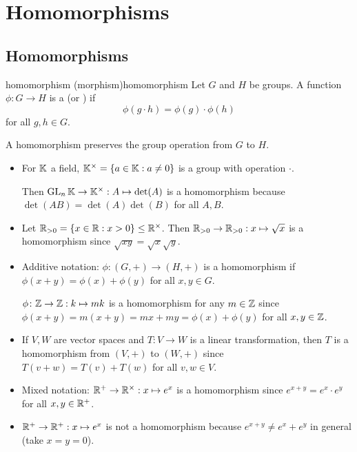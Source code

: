\documentclass[12pt,letterpaper]{report}
\begin{document}
\section{Homomorphisms}

\subsection{Homomorphisms}

\begin{defn}{homomorphism (morphism)}{homomorphism}
  Let $G$ and $H$ be groups.
  A function $\phi \colon G \to H$ is a  (or ) if
  \[ \phi(g \cdot h) = \phi(g) \cdot \phi(h) \]
  for all $g, h \in G$.
\end{defn}

A homomorphism preserves the group operation from $G$ to $H$.

\begin{ex}
  \begin{itemize}
    \item
    For $\mathbb{K}$ a field, $\mathbb{K}^\times = \{a \in \mathbb{K} : a \neq 0\}$ is a group with
    operation $\cdot$.

    Then $\operatorname{GL}_n \mathbb{K} \to \mathbb{K}^\times : A \mapsto \det(A)$ is a homomorphism because
    $\det(AB) = \det(A) \det(B)$ for all $A, B$.
    \item
    Let $\mathbb{R}_{> 0} = \{x \in \mathbb{R} : x > 0\} \leq \mathbb{R}^\times$.
    Then $\mathbb{R}_{> 0} \to \mathbb{R}_{> 0} : x \mapsto \sqrt{x}$ is a homomorphism since
    $\sqrt{xy} = \sqrt{x} \sqrt{y}$.
    \item
    Additive notation: $\phi \colon (G, +) \to (H, +)$ is a homomorphism if
    $\phi(x + y) = \phi(x) + \phi(y)$ for all $x, y \in G$.

    $\phi \colon \mathbb{Z} \to \mathbb{Z} : k \mapsto mk$ is a homomorphism for any
    $m \in \mathbb{Z}$ since $\phi(x + y) = m(x + y) = mx + my = \phi(x) + \phi(y)$ for all
    $x, y \in \mathbb{Z}$.
    \item
    If $V, W$ are vector spaces and $T \colon V \to W$ is a linear transformation, then $T$ is a
    homomorphism from $(V, +)$ to $(W, +)$ since $T(v + w) = T(v) + T(w)$ for all $v, w \in V$.
    \item
    Mixed notation: $\mathbb{R}^+ \to \mathbb{R}^\times : x \mapsto e^x$ is a homomorphism since
    $e^{x + y} = e^x \cdot e^y$ for all $x, y \in \mathbb{R}^+$.
    \item
    $\mathbb{R}^+ \to \mathbb{R}^+ : x \mapsto e^x$ is not a homomorphism because
    $e^{x + y} \neq e^x + e^y$ in general (take $x = y = 0$).
  \end{itemize}
\end{ex}
\end{document}
